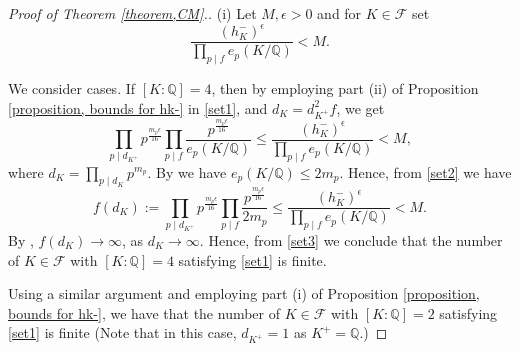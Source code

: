 \documentclass[12pt]{amsart}
\theoremstyle{definition}
\numberwithin{equation}{section}
\begin{document}
\begin{proof}[Proof of Theorem \ref{theorem,CM}.] 
(i) Let $M, \epsilon >0$ and for $K \in \mathcal{F}$ set
\begin{equation}
\label{set1}
\frac{(h_K^-)^{\epsilon}}{\prod_{p \mid f}e_p(K/\mathbb{Q})} < M.
\end{equation}

We consider cases. If $[K:\mathbb{Q}]=4$,  then by
 employing part (ii) of Proposition \ref{proposition, bounds for hk-} in \eqref{set1}, and $d_K=d_{K^+}^2 f$, we get
\begin{equation}
\label{set2}
 \prod_{p \mid d_{K^+}} p^{\frac{ m_p \epsilon}{16}} 
\prod_{p \mid f} \frac{p^{\frac{m_p \epsilon}{16}} }{e_p(K/\mathbb{Q})} \leq \frac{(h_K^-)^{\epsilon}}{\prod_{p \mid f} e_p(K/\mathbb{Q})} <M,
\end{equation}
where $d_K=\prod_{p\mid d_K} p^{m_p}$. By \cite[Chapter III, Proposition 8]{Lang} we have 
$e_p(K/\mathbb{Q})\leq 2m_p$. Hence, from \eqref{set2} we have
\begin{equation}
\label{set3}
f(d_K):= \prod_{p \mid d_{K^+}}
p^{\frac{ m_p \epsilon}{16}} \prod_{p \mid f} \frac{p^{\frac{m_p \epsilon}{16}} }{2m_p} \leq \frac{(h_K^-)^{\epsilon}}{\prod_{p \mid f} e_p(K/\mathbb{Q})} <M.
\end{equation}
By \cite[Theorem 316]{Hardy}, $ f(d_K) \rightarrow \infty$, as $d_K\rightarrow \infty$.
Hence, from \eqref{set3} we conclude that the number of $K \in \mathcal{F}$ with 
 $[K:\mathbb{Q}]=4$ satisfying \eqref{set1} is finite. 

Using a similar argument and employing part (i) of Proposition \ref{proposition, bounds for hk-}, we have that the number of $K \in \mathcal{F}$ with $[K:\mathbb{Q}]=2$
satisfying \eqref{set1} is finite (Note that in this case, $d_{K^+}=1$ as $K^+=\mathbb{Q}$.) 


\end{proof}
\end{document}
